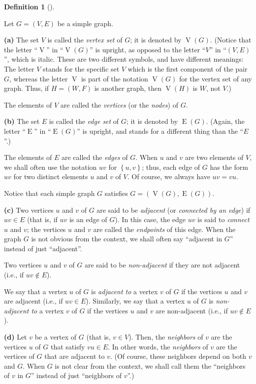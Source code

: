 \documentclass[numbers=enddot,12pt,final,onecolumn,notitlepage]{scrartcl}%
\theoremstyle{definition}
\newtheorem{defi}[theo]{Definition}
\newenvironment{definition}[1][]
{\begin{defi}[#1]\begin{leftbar}}
{\end{leftbar}\end{defi}}
\newcommand{\set}[1]{\left\{ #1 \right\}}
\newcommand{\tup}[1]{\left( #1 \right)}
\newcommand{\verts}[1]{\operatorname{V}\left( #1 \right)}
\newcommand{\edges}[1]{\operatorname{E}\left( #1 \right)}
\begin{document}
\begin{definition} \label{def.intro.simple.VE}
Let $G = \tup{V, E}$ be a simple graph.

\textbf{(a)} The set $V$ is called the \textit{vertex set} of $G$;
it is denoted by $\verts{G}$. (Notice that the letter
``$\operatorname{V}$'' in ``$\verts{G}$'' is upright, as opposed to
the letter ``$V$'' in ``$\tup{V, E}$'', which is italic.
These are two different symbols, and have different meanings: The
letter $V$ stands for the specific set $V$ which is the first
component of the pair $G$, whereas the letter
$\operatorname{V}$ is part of the notation $\verts{G}$ for the
vertex set of any graph. Thus, if $H = \left(W, F\right)$ is another
graph, then $\verts{H}$ is $W$, not $V$.)

The elements of $V$ are called the \textit{vertices} (or the
\textit{nodes}) of $G$.

\textbf{(b)} The set $E$ is called the \textit{edge set} of $G$; it
is denoted by $\edges{G}$. (Again, the letter ``$\operatorname{E}$''
in ``$\edges{G}$'' is upright, and stands for a different thing than
the ``$E$''.)

The elements of $E$ are called the \textit{edges} of $G$. When $u$ and
$v$ are two elements of $V$, we shall often use the notation $uv$ for
$\set{u, v}$; thus, each edge of $G$ has the form $uv$ for two
distinct elements $u$ and $v$ of $V$. Of course, we always have
$uv = vu$.

Notice that each simple graph $G$ satisfies
$G = \tup{\verts{G}, \edges{G}}$.

\textbf{(c)} Two vertices $u$ and $v$ of $G$ are said to be
\textit{adjacent} (or \textit{connected by an edge}) if $uv \in E$
(that is, if $uv$ is an edge of $G$). In this case, the edge $uv$ is
said to \textit{connect} $u$ and $v$; the vertices $u$ and $v$ are
called the \textit{endpoints} of this edge. When the graph $G$ is not
obvious from the context, we shall often say ``adjacent in $G$''
instead of just ``adjacent''.

Two vertices $u$ and $v$ of $G$
are said to be \textit{non-adjacent} if they are not adjacent (i.e.,
if $uv \notin E$).

We say that a vertex $u$ of $G$ is \textit{adjacent to} a vertex $v$
of $G$ if the vertices $u$ and $v$ are adjacent (i.e., if $uv \in E$).
Similarly, we say that a vertex $u$ of $G$ is \textit{non-adjacent to}
a vertex $v$ of $G$ if the vertices $u$ and $v$ are non-adjacent
(i.e., if $uv \notin E$).

\textbf{(d)} Let $v$ be a vertex of $G$ (that is, $v \in V$). Then,
the \textit{neighbors} of $v$ are the vertices $u$ of $G$ that
satisfy $vu \in E$.
In other words, the \textit{neighbors} of $v$ are the vertices of
$G$ that are adjacent to $v$.
(Of course, these neighbors depend on both $v$ and
$G$. When $G$ is not clear from the context, we shall call them the
``neighbors of $v$ in $G$'' instead of just ``neighbors of $v$''.)
\end{definition}
\end{document}

